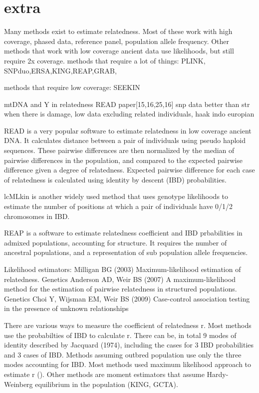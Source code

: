 \documentclass[12pt, letterpaper]{article}
\begin{document}




\section{extra}
Many methods exist to estimate relatedness. Most of these work with high coverage, phased data, reference panel, population allele frequency. Other methods that work with low coverage ancient data use likelihoods, but still require 2x coverage.
methods that require a lot of things: PLINK, SNPduo,ERSA,KING,REAP,GRAB,

methods that require low coverage: SEEKIN

mtDNA and Y in relatedness READ paper[15,16,25,16]
snp data better than str when there is damage, low data
excluding related individuals, haak indo europian

READ is a very popular software to estimate relatedness in low coverage ancient DNA. It calculates distance between a pair of individuals using pseudo haploid sequences. These pairwise differences are then normalized by the median of pairwise differences in the population, and compared to the expected pairwise difference given a degree of relatedness. Expected pairwise difference for each case of relatedness is calculated using identity by descent (IBD) probabilities. 

lcMLkin is another widely used method that uses genotype likelihoods to estimate the number of positions at which a pair of individuals have 0/1/2 chromosomes in IBD.  

REAP is a software to estimate relatedness coefficient and IBD prbabilities in admixed populations, accounting for structure. It requires the number of ancestral populations, and a representation of sub population allele frequencies. 

Likelihood estimators:
Milligan BG (2003) Maximum-likelihood estimation of relatedness. Genetics
Anderson AD, Weir BS (2007) A maximum-likelihood method for the estimation of pairwise relatedness in structured populations. Genetics
Choi Y, Wijsman EM, Weir BS (2009) Case-control association testing in the presence of unknown relationships

There are various ways to measure the coefficient of relatedness r. Most methods use the probabilties of IBD to calculate r. There can be, in total 9 modes of identity described by Jacquard (1974), including the cases for 3 IBD probabilities and 3 cases of IBD. Methods assuming outbred population use only the three modes accounting for IBD. Most methods used maximum likelihood approach to estimate r (). Other methods are moment estimators that assume Hardy-Weinberg equilibrium in the population (KING, GCTA).
\end{document}
